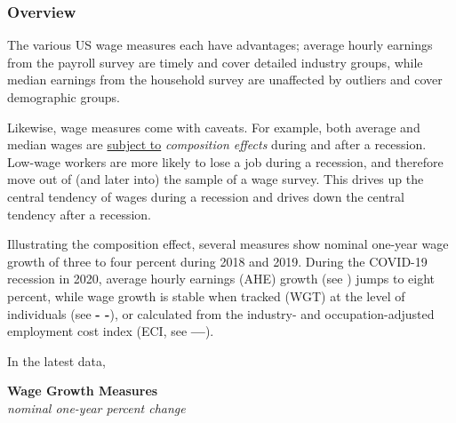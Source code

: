 \documentclass{report}
\begin{document}
{\begin{minipage}{1.0\textwidth}
\subsubsection*{Overview}
\vspace*{-1mm}

\small The various US wage measures each have advantages; average hourly earnings from the payroll survey are timely and cover detailed industry groups, while median earnings from the household survey are unaffected by outliers and cover demographic groups. 

Likewise, wage measures come with caveats. For example, both average and median wages are \href{https://www.dallasfed.org/research/economics/2022/0215}{subject to} \textit{composition effects} during and after a recession. Low-wage workers are more likely to lose a job during a recession, and therefore move out of (and later into) the sample of a wage survey. This drives up the central tendency of wages during a recession and drives down the central tendency after a recession. 
\end{minipage}

\begin{minipage}{0.385\textwidth}
\small Illustrating the composition effect, several measures show nominal one-year wage growth of three to four percent during 2018 and 2019. During the COVID-19 recession in 2020, average hourly earnings (AHE) growth (see \color{magenta}{---}\color{black}) jumps to eight percent, while wage growth is stable when tracked (WGT) at the level of individuals (see \color{blue}\textbf{- -}\color{black}), or calculated from the industry- and occupation-adjusted employment cost index (ECI, see \color{violet}\textbf{---}\color{black}).

In the latest data, 
\end{minipage} \hspace{4mm} \begin{minipage}{0.335\textwidth}
\normalsize \textbf{Wage Growth Measures}\\
\footnotesize{\textit{nominal one-year percent change}}
\vspace{3.3cm}


\end{minipage}}
\end{document}
